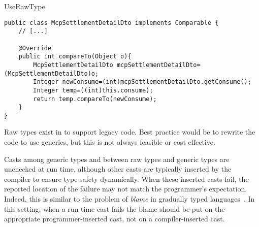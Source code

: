 \begin{pattern}{UseRawType}
\begin{verbatim}
public class McpSettlementDetailDto implements Comparable {
    // [...]

    @Override
    public int compareTo(Object o){
        McpSettlementDetailDto mcpSettlementDetailDto=(McpSettlementDetailDto)o;
        Integer newConsume=(int)mcpSettlementDetailDto.getConsume();
        Integer temp=((int)this.consume);
        return temp.compareTo(newConsume);
    }
}
\end{verbatim}

\discussion{}
Raw types exist in \java{} to support legacy code.
Best practice would be to rewrite the code to use generics,
but this is not always feasible or cost effective.

Casts among generic types and between raw types and generic types are unchecked at run time,
although other casts are typically inserted by the compiler to ensure type safety dynamically.
When these inserted casts fail, the reported location of the failure may not match the programmer's expectation.
Indeed, this is similar to the problem of \emph{blame} in gradually typed languages~\cite{wadlerWellTypedProgramsCan2009}.
In this setting, when a run-time cast fails the blame should be put on the appropriate programmer-inserted cast,
not on a compiler-inserted cast.

\end{pattern}
